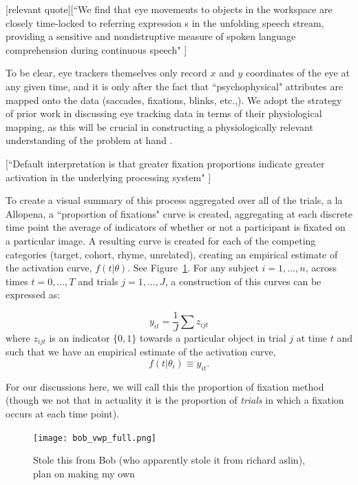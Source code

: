 [relevant quote][``We find that eye movements to objects in the workspace are closely time-locked to referring expression s in the unfolding speech stream, providing a sensitive and nondistruptive measure of spoken language comprehension during continuous speech" \cite{allopenna1998tracking}]

To be clear, eye trackers themselves only record $x$ and $y$ coordinates of the eye at any given time, and it is only after the fact that ``psychophysical" attributes are mapped onto the data (saccades, fixations, blinks, etc.,). We adopt the strategy of prior work in discussing eye tracking data in terms of their physiological mapping, as this will be crucial in constructing a physiologically relevant understanding of the problem at hand \cite{mcmurray2002look}.

[``Default interpretation is that greater fixation proportions indicate greater activation in the underlying processing system" \cite{Magnuson2019}]


To create a visual summary of this process aggregated over all of the trials, a la Allopena, a ``proportion of fixations" curve is created, aggregating at each discrete time point the average of indicators of whether or not a participant is fixated on a particular image. A resulting curve is created for each of the competing categories (target, cohort, rhyme, unrelated), creating an empirical estimate of the activation curve, $f(t|\theta)$. See Figure~\ref{fig:bob_diagram_full}. For any subject $i = 1, \dots, n$, across times $t = 0, \dots, T$ and trials $j = 1, \dots, J$, a construction  of this curves can be expressed as:


\begin{equation}\label{eq:sum_proportions}
y_{it} = \frac1J \sum z_{ijt}
\end{equation}
where $z_{ijt}$ is an indicator $\{0, 1\}$  towards a particular object in trial $j$ at time $t$ and such that we have an empirical estimate of the activation curve,
\begin{equation}\label{eq:empir_to_activation}
f(t | \theta_i) \equiv y_{it}.
\end{equation}



For our discussions here, we will call this the proportion of fixation method (though we not that in actuality it is the proportion of \textit{trials} in which a fixation occurs at each time point).


\begin{figure}[H]
\centering
\texttt{[image: bob\_vwp\_full.png]}
\caption{Stole this from Bob (who apparently stole it from richard aslin), plan on making my own}
\label{fig:bob_diagram_full}
\end{figure}

